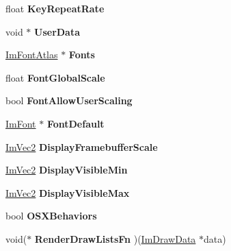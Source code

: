 \begin{DoxyCompactItemize}
float {\bfseries Key\+Repeat\+Rate}
\item 
\mbox{\label{struct_im_gui_i_o_a8c5e74fd39c2655455329e09529da7d3}} 
void $\ast$ {\bfseries User\+Data}
\item 
\mbox{\label{struct_im_gui_i_o_a24e4f5201fe8780267abc2acfc24254c}} 
\hyperlink{struct_im_font_atlas}{Im\+Font\+Atlas} $\ast$ {\bfseries Fonts}
\item 
\mbox{\label{struct_im_gui_i_o_a74a64a74dcbe2a6ef0c1ef56ba328094}} 
float {\bfseries Font\+Global\+Scale}
\item 
\mbox{\label{struct_im_gui_i_o_af5fc6eae7ce68cce8473f006431f530e}} 
bool {\bfseries Font\+Allow\+User\+Scaling}
\item 
\mbox{\label{struct_im_gui_i_o_a11016e4aefa603523bce61315b66bf00}} 
\hyperlink{struct_im_font}{Im\+Font} $\ast$ {\bfseries Font\+Default}
\item 
\mbox{\label{struct_im_gui_i_o_a703cad6bd4c9e8972d056116104d27e8}} 
\hyperlink{struct_im_vec2}{Im\+Vec2} {\bfseries Display\+Framebuffer\+Scale}
\item 
\mbox{\label{struct_im_gui_i_o_a45b49309f2f8765622962ed7f286674d}} 
\hyperlink{struct_im_vec2}{Im\+Vec2} {\bfseries Display\+Visible\+Min}
\item 
\mbox{\label{struct_im_gui_i_o_a9bb46e8da3da68b83c66219beb861cb1}} 
\hyperlink{struct_im_vec2}{Im\+Vec2} {\bfseries Display\+Visible\+Max}
\item 
\mbox{\label{struct_im_gui_i_o_a1de170af44fcd4d76efe801a7879313c}} 
bool {\bfseries O\+S\+X\+Behaviors}
\item 
\mbox{\label{struct_im_gui_i_o_ae16a9f25f36fe9706d8a33fb128e538a}} 
void($\ast$ {\bfseries Render\+Draw\+Lists\+Fn} )(\hyperlink{struct_im_draw_data}{Im\+Draw\+Data} $\ast$data)
\item 
\mbox{\label{struct_im_gui_i_o_ab7face2b2efef720a22a7fb2143d415c}} 

\end{DoxyCompactItemize}
